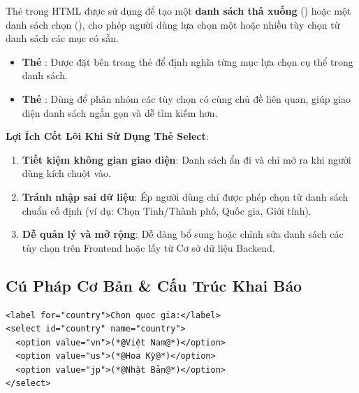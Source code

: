 \begin{conceptBox}
Thẻ  trong HTML được sử dụng để tạo một \textbf{danh sách thả xuống} () hoặc một danh sách chọn (), cho phép người dùng lựa chọn một hoặc nhiều tùy chọn từ danh sách các mục có sẵn.
\begin{itemize}[leftmargin=1.5em, itemsep=2pt, parsep=0pt]
    \item \textbf{Thẻ }: Được đặt bên trong thẻ  để định nghĩa từng mục lựa chọn cụ thể trong danh sách.
    \item \textbf{Thẻ }: Dùng để phân nhóm các tùy chọn có cùng chủ đề liên quan, giúp giao diện danh sách ngắn gọn và dễ tìm kiếm hơn.
\end{itemize}

\tcblower
\textbf{ Lợi Ích Cốt Lõi Khi Sử Dụng Thẻ Select}:
\begin{enumerate}[leftmargin=1.2em, itemsep=2pt, parsep=0pt]
    \item \textbf{Tiết kiệm không gian giao diện}: Danh sách ẩn đi và chỉ mở ra khi người dùng kích chuột vào.
    \item \textbf{Tránh nhập sai dữ liệu}: Ép người dùng chỉ được phép chọn từ danh sách chuẩn cố định (ví dụ: Chọn Tỉnh/Thành phố, Quốc gia, Giới tính).
    \item \textbf{Dễ quản lý và mở rộng}: Dễ dàng bổ sung hoặc chỉnh sửa danh sách các tùy chọn trên Frontend hoặc lấy từ Cơ sở dữ liệu Backend.
\end{enumerate}
\end{conceptBox}

\subsection{Cú Pháp Cơ Bản \& Cấu Trúc Khai Báo}

\begin{codeWindow}
\begin{lstlisting}[language=HTML5]
<label for="country">Chon quoc gia:</label>
<select id="country" name="country">
  <option value="vn">(*@Việt Nam@*)</option>
  <option value="us">(*@Hoa Kỳ@*)</option>
  <option value="jp">(*@Nhật Bản@*)</option>
</select>
\end{lstlisting}
\end{codeWindow}

